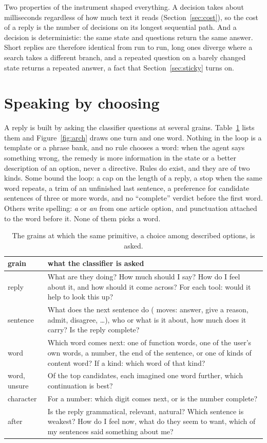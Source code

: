 \documentclass[10pt,twocolumn]{article}
\begin{document}
Two properties of the instrument shaped everything. A decision takes about \MsPerCall{} milliseconds
regardless of how much text it reads (Section~\ref{sec:cost}), so the cost of a reply is the number
of decisions on its longest sequential path. And a decision is deterministic: the same state and
questions return the same answer. Short replies are therefore identical from run to run, long ones
diverge where a search takes a different branch, and a repeated question on a barely changed state
returns a repeated answer, a fact that Section~\ref{sec:sticky} turns on.

\section{Speaking by choosing}\label{sec:method}

A reply is built by asking the classifier questions at several grains. Table~\ref{tab:grains} lists
them and Figure~\ref{fig:arch} draws one turn and one word. Nothing in the loop is a template or a phrase bank, and no rule chooses a word: when the
agent says something wrong, the remedy is more information in the state or a better description of
an option, never a directive. Rules do exist, and they are of two kinds. Some bound the loop: a cap
on the length of a reply, a stop when the same word repeats, a trim of an unfinished last sentence,
a preference for candidate sentences of three or more words, and no ``complete'' verdict before the
first word. Others write spelling: \emph{a} or \emph{an} from one article option, and punctuation
attached to the word before it. None of them picks a word.

\begin{table}[t]
\small
\begin{tabularx}{\columnwidth}{@{}lX@{}}
\toprule
grain & what the classifier is asked \\
\midrule
reply & What are they doing? How much should I say? How do I feel about it, and how should it come
across? For each tool: would it help to look this up? \\
sentence & What does the next sentence do (\Moves{} moves: answer, give a reason, admit, disagree,
\ldots), who or what is it about, how much does it carry? Is the reply complete? \\
word & Which word comes next: one of \GrammarWords{} function words, one of the user's own words, a
number, the end of the sentence, or one of \Categories{} kinds of content word? If a kind: which
word of that kind? \\
word, unsure & Of the top candidates, each imagined one word further, which continuation is best? \\
character & For a number: which digit comes next, or is the number complete? \\
after & Is the reply grammatical, relevant, natural? Which sentence is weakest? How do I feel now,
what do they seem to want, which of my sentences said something about me? \\
\bottomrule
\end{tabularx}
\caption{The grains at which the same primitive, a choice among described options, is asked.}
\label{tab:grains}
\end{table}
\end{document}
